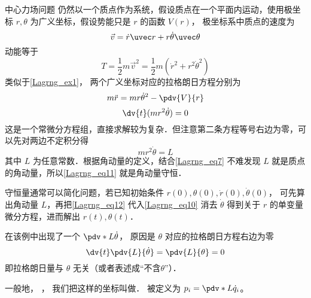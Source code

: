 \begin{exam}{中心力场问题}
仍然以一个质点作为系统，假设质点在一个平面内运动，使用极坐标 $r,\theta$ 为广义坐标，假设势能只是 $r$ 的函数 $V(r)$， 极坐标系中质点的速度为%
\begin{equation}\label{Lagrng_eq7}
\vec v = \dot r\uvec r + r\dot \theta \uvec \theta
\end{equation}
动能等于
\begin{equation}
T = \frac 12 m\vec v^2 = \frac{1}{2}m(\dot r^2 + r^2 \dot \theta^2)
\end{equation}
类似于\autoref{Lagrng_ex1}， 两个广义坐标对应的拉格朗日方程分别为
\begin{equation}\label{Lagrng_eq10}
m\ddot r = mr{\dot \theta}^2 - \pdv{V}{r}
\end{equation}
\begin{equation}\label{Lagrng_eq11}
\dv{t} (m r^2\dot \theta)  = 0
\end{equation}
这是一个常微分方程组，直接求解较为复杂．但注意第二条方程等号右边为零，可以先对两边不定积分得
\begin{equation}\label{Lagrng_eq12}
mr^2\dot\theta = L
\end{equation}
其中 $L$ 为任意常数．根据角动量的定义，结合\autoref{Lagrng_eq7} 不难发现 $L$ 就是质点的角动量，所以\autoref{Lagrng_eq11} 就是角动量守恒．

守恒量通常可以简化问题，若已知初始条件 $r(0),\theta (0), \dot r(0),\dot \theta (0)$， 可先算出角动量 $L$，再把\autoref{Lagrng_eq12} 代入\autoref{Lagrng_eq10} 消去 $\dot\theta$ 得到关于 $r$ 的单变量微分方程，进而解出 $r(t),\theta (t)$．
\end{exam}

在该例中出现了一个 $\pdv*{L}{\dot\theta}$， 原因是 $\theta$ 对应的拉格朗日方程右边为零
\begin{equation}
\dv{t}\pdv{L}{\dot\theta} = \pdv{L}{\theta} = 0
\end{equation}
即拉格朗日量与 $\theta$ 无关（或者表述成“不含$\theta$”）．

一般地， ， 我们把这样的坐标叫做． 被定义为 $p_i = \pdv*{L}{\dot q_i}$。 


